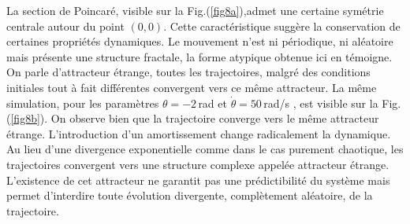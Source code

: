 \documentclass[a4paper,12pt,twoside]{article}
\begin{document}
La section de Poincaré, visible sur la Fig.(\ref{fig8a}),admet une certaine symétrie centrale autour du point $(0,0)$. Cette caractéristique suggère la conservation de certaines propriétés dynamiques. Le mouvement n'est ni périodique, ni aléatoire mais présente une structure fractale, la forme atypique obtenue ici en témoigne. On parle d'attracteur étrange, toutes les trajectoires, malgré des conditions initiales tout à fait différentes convergent vers ce même attracteur. La même simulation, pour les paramètres $\theta=-2$\,rad et $\dot{\theta}=50$\,rad/s , est visible sur la Fig.(\ref{fig8b}). On observe bien que la trajectoire converge vers le même attracteur étrange. L’introduction d’un amortissement change radicalement la dynamique. Au lieu d’une divergence exponentielle comme dans le cas purement chaotique, les trajectoires convergent vers une structure complexe appelée attracteur étrange. L'existence de cet attracteur ne garantit pas une prédictibilité du système mais permet d'interdire toute évolution divergente, complètement aléatoire, de la trajectoire.
\end{document}
